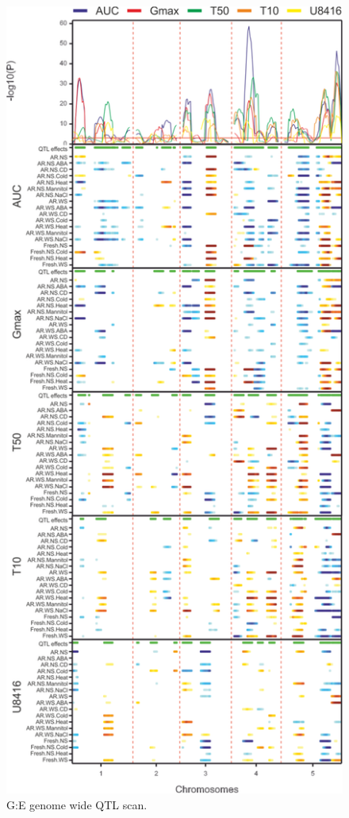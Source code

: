\begin{figure}[h!]
  \centering
  \includegraphics[keepaspectratio,scale=0.30]{eps/image_3_1_7.eps}
  \caption[G:E genome wide QTL scan.]
    {G:E genome wide QTL scan.}
\end{figure}

